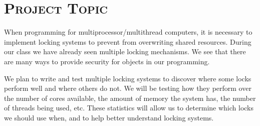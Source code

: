 \documentclass[finalProject.tex]{subfiles}
\begin{document}
\bigskip

\section*{\textsc{\Large Project Topic}}

	When programming for multiprocessor/multithread computers, it is necessary to implement locking systems to prevent from overwriting shared resources.  During our class we have already seen multiple locking mechanisms.  We see that there are many ways to provide security for objects in our programming.  
	
	We plan to write and test multiple locking systems to discover where some locks perform well and where others do not.  We will be testing how they perform over the number of cores available, the amount of memory the system has, the number of threads being used, etc.  These statistics will allow us to determine which locks we should use when, and to help better understand locking systems.
\end{document}
